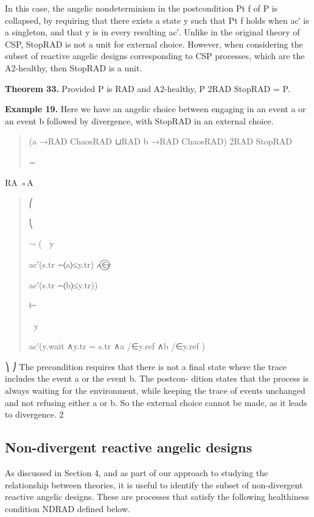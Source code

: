 \documentclass[11pt]{article}
\begin{document}
In this case, the angelic nondeterminism in the postcondition Pt f of P is collapsed, by requiring that there exists a state y such that Pt f holds when ac′ is a singleton, and that y is in every resulting ac′. Unlike in the original theory of CSP, StopRAD is not a unit for external choice. However, when considering the subset of reactive angelic designs corresponding to CSP processes, which are the A2-healthy, then StopRAD is a unit.

\noindent\textbf{Theorem 33.} Provided P is RAD and A2-healthy, P 2RAD StopRAD = P.


\noindent\textbf{Example 19.} Here we have an angelic choice between engaging in an event a or an event b followed by divergence, with StopRAD in an external choice.


\begin{quote}\small\raggedright
(a →RAD ChaosRAD ⊔RAD b →RAD ChaosRAD) 2RAD StopRAD
\par
=
\end{quote}

RA ◦A

\begin{quote}\small\raggedright
⎛
\par
⎝
\par
¬ ( ∈⃝y
\par
ac′(s.tr ⌢⟨a⟩≤y.tr) ∧∈⃝y
\par
ac′(s.tr ⌢⟨b⟩≤y.tr))
\par
⊢
\par
∈⃝y
\par
ac′(y.wait ∧y.tr = s.tr ∧a /∈y.ref ∧b /∈y.ref )
\end{quote}

⎞ ⎠ The precondition requires that there is not a final state where the trace includes the event a or the event b. The postcon- dition states that the process is always waiting for the environment, while keeping the trace of events unchanged and not refusing either a or b. So the external choice cannot be made, as it leads to divergence. 2

\subsection{Non-divergent reactive angelic designs}
As discussed in Section 4, and as part of our approach to studying the relationship between theories, it is useful to identify the subset of non-divergent reactive angelic designs. These are processes that satisfy the following healthiness condition NDRAD defined below.
\end{document}

